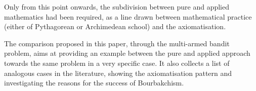 \documentclass[]{scrartcl}
\theoremstyle{definition}
\begin{document}
Only from this point onwards, the subdivision between pure and applied mathematics had been required, as a line drawn between mathematical practice (either of Pythagorean or Archimedean school) and the axiomatisation.

The comparison proposed in this paper, through the multi-armed bandit problem, aims at providing an example between the pure and applied approach towards the same problem in a very specific case. It also collects a list of analogous cases in the literature, showing the axiomatisation pattern and investigating the reasons for the success of Bourbakchism.



%
%
%
%
%




\end{document}

